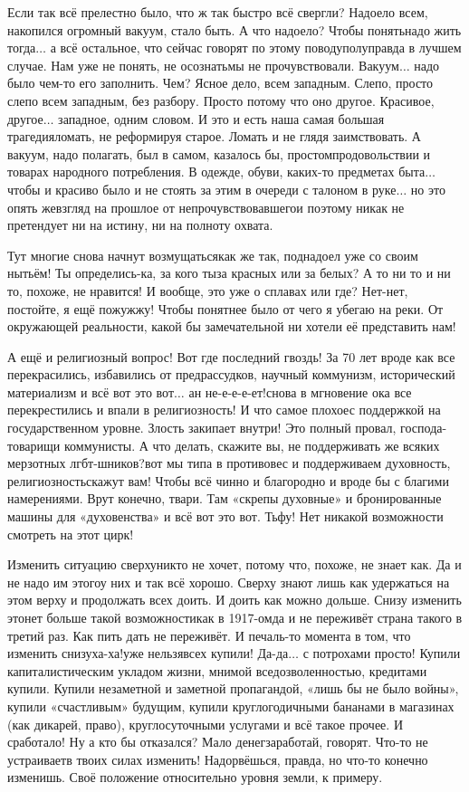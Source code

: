 Если так всё прелестно было, что ж так быстро всё свергли? Надоело всем, накопился огромный вакуум, стало быть. А что надоело? Чтобы понять\mdash надо жить тогда$\ldots$ а всё остальное, что сейчас говорят по этому поводу\mdash полуправда в лучшем случае. Нам уже не понять, не осознать\mdash мы не прочувствовали. Вакуум$\ldots$ надо было чем-то его заполнить. Чем? Ясное дело, всем западным. Слепо, просто слепо всем западным, без разбору. Просто потому что оно другое. Красивое, другое$\ldots$ западное, одним словом. И это и есть наша самая большая трагедия\mdash ломать, не реформируя старое. Ломать и не глядя заимствовать. А вакуум, надо полагать, был в самом, казалось бы, простом\mdash продовольствии и товарах народного потребления. В одежде, обуви, каких-то предметах быта$\ldots$ чтобы и красиво было и не стоять за этим в очереди с талоном в руке$\ldots$ но это опять же\mdash взгляд на прошлое от непрочувствовавшего\mdash и поэтому никак не претендует ни на истину, ни на полноту охвата.

Тут многие снова начнут возмущаться\mdash как же так, поднадоел уже со своим нытьём! Ты определись-ка, за кого ты\mdash за красных или за белых? А то ни то и ни то, похоже, не нравится! И вообще, это уже о сплавах или где? Нет-нет, постойте, я ещё пожужжу! Чтобы понятнее было от чего я убегаю на реки. От окружающей реальности, какой бы замечательной ни хотели её представить нам!

А ещё и религиозный вопрос! Вот где последний гвоздь! За 70 лет вроде как все перекрасились, избавились от предрассудков, научный коммунизм, исторический материализм и всё вот это вот$\ldots$ ан не-е-е-е-ет!\mdash снова в мгновение ока все перекрестились и впали в религиозность! И что самое плохое\mdash с поддержкой на государственном уровне. Злость закипает внутри! Это полный провал, господа-товарищи коммунисты. А что делать, скажите вы, не поддерживать же всяких мерзотных лгбт-шников?\mdash вот мы типа в противовес и поддерживаем духовность, религиозность\mdash скажут вам! Чтобы всё чинно и благородно и вроде бы с благими намерениями. Врут конечно, твари. Там «скрепы духовные» и бронированные машины для «духовенства» и всё вот это вот. Тьфу! Нет никакой возможности смотреть на этот цирк!

Изменить ситуацию сверху\mdash никто не хочет, потому что, похоже, не знает как. Да и не надо им этого\mdash у них и так всё хорошо. Сверху знают лишь как удержаться на этом верху и продолжать всех доить. И доить как можно дольше. Снизу изменить это\mdash нет больше такой возможности\mdash как в 1917-ом\mdash да и не переживёт страна такого в третий раз. Как пить дать не переживёт. И печаль-то момента в том, что изменить снизу\mdash ха-ха!\mdash уже нельзя\mdash всех купили! Да-да$\ldots$ с потрохами просто! Купили капиталистическим укладом жизни, мнимой вседозволенностью, кредитами купили. Купили незаметной и заметной пропагандой, «лишь бы не было войны», купили «счастливым» будущим, купили круглогодичными бананами в магазинах (как дикарей, право), круглосуточными услугами и всё такое прочее. И сработало! Ну а кто бы отказался? Мало денег\mdash заработай, говорят. Что-то не устраивает\mdash в твоих силах изменить! Надорвёшься, правда, но что-то конечно изменишь. Своё положение относительно уровня земли, к примеру.

